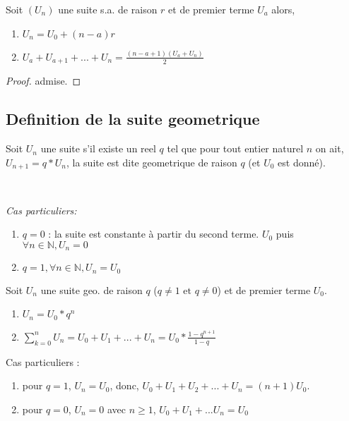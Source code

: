 \documentclass[a4paper,10pt]{book}
\begin{document}
			\begin{prop}
				Soit $(U_n)$ une suite s.a. de raison $r$ et de premier terme $U_a$ alors,
					\begin{enumerate}
						\item $U_n = U_0 + (n-a)r$
						\item $U_a + U_{a+1} + ... + U_n = \frac{(n-a+1)(U_a+U_n)}{2}$
					\end{enumerate}
			\end{prop}

			\begin{proof}
				admise.
			\end{proof}

		\subsection{Definition de la suite geometrique}
			\begin{Def}
				Soit $U_n$ une suite s'il existe un reel $q$ tel que pour tout entier naturel $n$ on ait,\\
				$U_{n+1} = q * U_n$, la suite est dite geometrique de raison $q$ (et $U_0$ est donné).\\
			\end{Def}

			\medskip\\

			\begin{rem}
				\textit{Cas particuliers:}
				\begin{enumerate}
					\item $q = 0$ : la suite est constante à partir du second terme. $U_0$ puis $\forall n \in \mathbb{N}, U_n = 0$
					\item $q=1, \forall n \in \mathbb{N}, U_n = U_0$
				\end{enumerate}
			\end{rem}

			\newpage

			\begin{prop}
				Soit $U_n$ une suite geo. de raison $q$ ($q \neq 1 \text{ et } q \neq 0$) et de premier terme $U_0$.
				\begin{enumerate}
					\item $U_n = U_0 * q^n$
					\item $\sum_{k = 0}^{n}U_n = U_0 + U_1 + ... + U_n = U_0 * \frac{1-q^{n+1}}{1 - q}$\\
				\end{enumerate}

				Cas particuliers :
				\begin{enumerate}
					\item pour $q=1$, $U_n = U_0$, donc, $U_0 + U_1 + U_2 + ... + U_n = (n+1)U_0$.
					\item pour $q=0$, $U_n = 0$ avec $n \geq 1$, $U_0 + U_1 + ... U_n = U_0$\\
				\end{enumerate}
			\end{prop}
\end{document}
